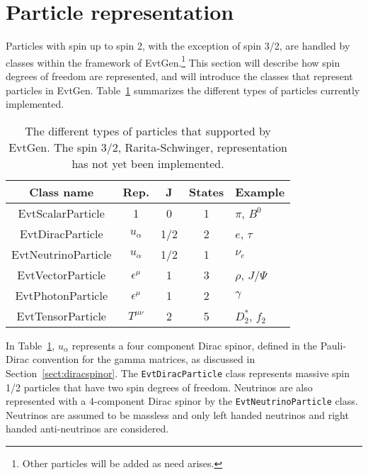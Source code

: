\section{Particle representation}
\label{sect:amplitudes}

Particles with spin up to spin 2, with the exception of spin 3/2,
are handled by classes within the framework of EvtGen.\footnote{
Other particles will be added as need arises.
}
This
section will describe how spin degrees of freedom are
represented, and will introduce the classes that represent
particles in EvtGen.  Table~\ref{tab:reps} summarizes the different
types of particles currently implemented.

\begin{table}[htbp]
\begin{center}
\begin{tabular}{ccccl} \hline
Class name     &  Rep. &  J   &  States   & Example \\ \hline
EvtScalarParticle   &  1    &   0  &    1      &  $\pi$, $B^0$ \\
EvtDiracParticle    & $u_{\alpha}$& 1/2 & 2       &  $e$, $\tau$ \\
EvtNeutrinoParticle & $u_{\alpha}$& 1/2 & 1       &  $\nu_e$ \\
EvtVectorParticle   & $\epsilon^{\mu}$ & 1 & 3&  $\rho$, $J/\Psi$ \\
EvtPhotonParticle   & $\epsilon^{\mu}$ & 1 & 2&  $\gamma$ \\
EvtTensorParticle   & $T^{\mu\nu}$ & 2 & 5 &   $D^*_2$, $f_2$ \\ \hline
\end{tabular}
\caption{The different types of particles that supported by EvtGen.
The spin 3/2, Rarita-Schwinger, representation has not yet been
implemented.
\label{tab:reps}}
\end{center}
\end{table}

In Table~\ref{tab:reps}, $u_{\alpha}$ 
represents a four component Dirac spinor,
defined in the Pauli-Dirac convention for the
gamma matrices, as discussed in Section~\ref{sect:diracspinor}.
The {\tt EvtDiracParticle} class represents
massive spin 1/2 particles that have
two spin degrees of freedom. Neutrinos are also represented
with a 4-component Dirac spinor by the {\tt EvtNeutrinoParticle}
class.  Neutrinos are assumed to
be massless and only left handed neutrinos and 
right handed anti-neutrinos
are considered. 

